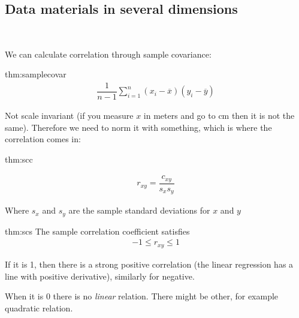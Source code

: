 \subsection{Data materials in several dimensions}\hfill\\\par
\noindent We can calculate correlation through sample covariance:
\par\bigskip
\begin{theo}{thm:samplecovar}
  \begin{equation*}
    \begin{gathered}
      \dfrac{1}{n-1}\sum_{i=1}^{n}(x_i-\overline{x})(y_i-\overline{y})
    \end{gathered}
  \end{equation*}
\end{theo}\par
\noindent Not scale invariant (if you measure $x$ in meters and go to cm then it is not the same). Therefore we need to norm it with something, which is where the correlation comes in:
\par\bigskip
\begin{theo}{thm:scc}

  \begin{equation*}
    \begin{gathered}
      r_{xy} = \dfrac{c_{xy}}{s_xs_y}
    \end{gathered}
  \end{equation*}\par
  \noindent Where $s_x$ and $s_y$ are the sample standard deviations for $x$ and $y$
\end{theo}
\par\bigskip
\begin{theo}{thm:scs}
  The sample correlation coefficient satisfies
  \begin{equation*}
    \begin{gathered}
      -1\leq r_{xy}\leq 1
    \end{gathered}
  \end{equation*}\par
  \noindent If it is 1, then there is a strong positive correlation (the linear regression has a line with positive derivative), similarly for negative.\par
  \noindent When it is 0 there is no \textit{linear} relation. There might be other, for example quadratic relation.
\end{theo}
